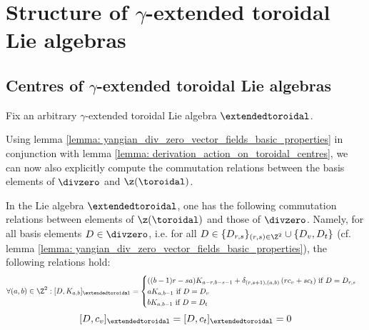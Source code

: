 \section{Structure of \texorpdfstring{$\gamma$}{}-extended toroidal Lie algebras}
    \subsection{Centres of \texorpdfstring{$\gamma$}{}-extended toroidal Lie algebras}
        Fix an arbitrary $\gamma$-extended toroidal Lie algebra $\extendedtoroidal$.
    
        Using lemma \ref{lemma: yangian_div_zero_vector_fields_basic_properties} in conjunction with lemma \ref{lemma: derivation_action_on_toroidal_centres}, we can now also explicitly compute the commutation relations between the basis elements of $\divzero$ and $\z(\toroidal)$.
        \begin{lemma} \label{lemma: explicit_commutators_between_central_basis_elements_and_derivations}
            In the Lie algebra $\extendedtoroidal$, one has the following commutation relations between elements of $\z(\toroidal)$ and those of $\divzero$. Namely, for all basis elements $D \in \divzero$, i.e. for all $D \in \{D_{r, s}\}_{(r, s) \in \Z^2} \cup \{D_v, D_t\}$ (cf. lemma \ref{lemma: yangian_div_zero_vector_fields_basic_properties}), the following relations hold:
                $$
                    \forall (a, b) \in \Z^2: [D, K_{a, b}]_{\extendedtoroidal} =
                    \begin{cases}
                        \text{$((b - 1)r - sa) K_{a - r, b - s - 1} + \delta_{(r, s + 1), (a, b)} \left( r c_v + s c_t \right)$ if $D = D_{r, s}$}
                        \\
                        \text{$a K_{a, b - 1}$ if $D = D_v$}
                        \\
                        \text{$b K_{a, b - 1}$ if $D = D_t$}
                    \end{cases}
                $$
                $$[D, c_v]_{\extendedtoroidal} = [D, c_t]_{\extendedtoroidal} = 0$$
        \end{lemma}
